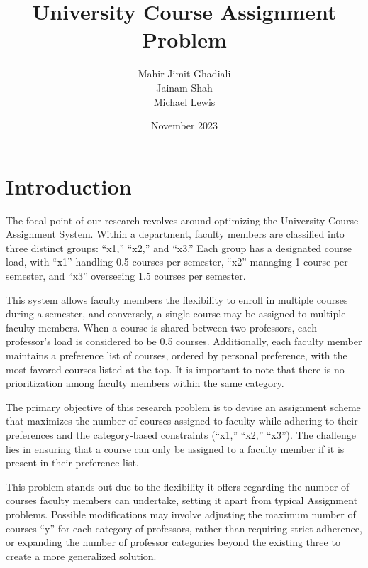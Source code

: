\documentclass{article}
\title{University Course Assignment Problem}
\author{
  Mahir Jimit Ghadiali \\
  Jainam Shah \\
  Michael Lewis
}
\date{November 2023}
\begin{document}
\maketitle

\section{Introduction}
The focal point of our research revolves around optimizing the University Course Assignment System. Within a department, faculty members are classified into three distinct groups: ``x1,'' ``x2,'' and ``x3.'' Each group has a designated course load, with ``x1'' handling 0.5 courses per semester, ``x2'' managing 1 course per semester, and ``x3'' overseeing 1.5 courses per semester.

This system allows faculty members the flexibility to enroll in multiple courses during a semester, and conversely, a single course may be assigned to multiple faculty members. When a course is shared between two professors, each professor's load is considered to be 0.5 courses. Additionally, each faculty member maintains a preference list of courses, ordered by personal preference, with the most favored courses listed at the top. It is important to note that there is no prioritization among faculty members within the same category.

The primary objective of this research problem is to devise an assignment scheme that maximizes the number of courses assigned to faculty while adhering to their preferences and the category-based constraints (``x1,'' ``x2,'' ``x3''). The challenge lies in ensuring that a course can only be assigned to a faculty member if it is present in their preference list.

This problem stands out due to the flexibility it offers regarding the number of courses faculty members can undertake, setting it apart from typical Assignment problems. Possible modifications may involve adjusting the maximum number of courses ``y'' for each category of professors, rather than requiring strict adherence, or expanding the number of professor categories beyond the existing three to create a more generalized solution.
\end{document}
